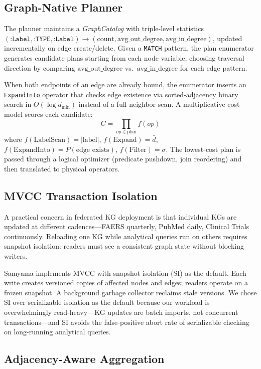 \documentclass[runningheads]{llncs}
\begin{document}
\subsection{Graph-Native Planner}\label{sec:planner}

The planner maintains a \emph{GraphCatalog} with triple-level
statistics
$(\texttt{:Label}, \texttt{:TYPE}, \texttt{:Label}) \to
(\text{count}, \text{avg\_out\_degree}, \text{avg\_in\_degree})$,
updated incrementally on edge create/delete.  Given a \texttt{MATCH}
pattern, the plan enumerator generates candidate plans starting from
each node variable, choosing traversal direction by comparing
$\text{avg\_out\_degree}$ vs.\ $\text{avg\_in\_degree}$ for each
edge pattern.

When both endpoints of an edge are already bound, the enumerator
inserts an \texttt{ExpandInto} operator that checks edge existence
via sorted-adjacency binary search in $O(\log d_{\min})$ instead of
a full neighbor scan.  A multiplicative cost model scores each
candidate:
\[
  C = \prod_{op \in \text{plan}} f(op)
\]
where $f(\text{LabelScan}) = |\text{label}|$,
$f(\text{Expand}) = \bar{d}$,
$f(\text{ExpandInto}) = P(\text{edge exists})$,
$f(\text{Filter}) = \sigma$.
The lowest-cost plan is passed through a logical optimizer
(predicate pushdown, join reordering) and then translated to
physical operators.

\subsection{MVCC Transaction Isolation}\label{sec:mvcc}

A practical concern in federated KG deployment is that individual
KGs are updated at different cadences---FAERS quarterly, PubMed
daily, Clinical Trials continuously.  Reloading one KG while
analytical queries run on others requires snapshot isolation:
readers must see a consistent graph state without blocking writers.

Samyama implements MVCC with snapshot isolation (SI) as the default.
Each write creates versioned copies of affected nodes and edges;
readers operate on a frozen snapshot.  A background garbage collector
reclaims stale versions.  We chose SI over serializable isolation
as the default because our workload is overwhelmingly
read-heavy---KG updates are batch imports, not concurrent
transactions---and SI avoids the false-positive abort rate of
serializable checking on long-running analytical queries.

\subsection{Adjacency-Aware Aggregation}\label{sec:adj-agg}
\end{document}
